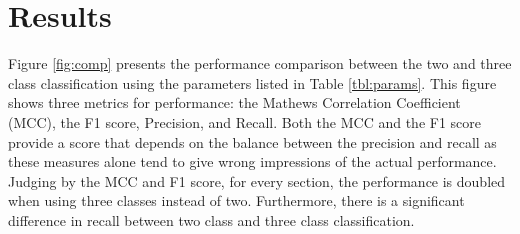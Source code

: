 \section{Results}

Figure \ref{fig:comp} presents the performance comparison between the two and three class classification using the parameters listed in Table \ref{tbl:params}. This figure shows three metrics for performance: the Mathews Correlation Coefficient (MCC), the F1 score, Precision, and Recall. Both the MCC and the F1 score provide a score that depends on the balance between the precision and recall as these measures alone tend to give wrong impressions of the actual performance. Judging by the MCC and F1 score, for every section, the performance is doubled when using three classes instead of two. Furthermore, there is a significant difference in recall between two class and three class classification.


\datazero
{}\dataone
{}\datatwo
{}\datafone


